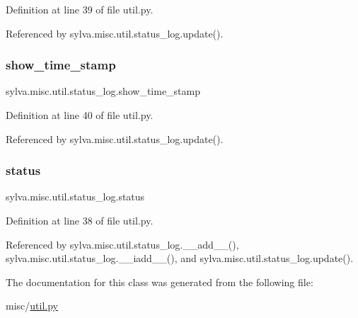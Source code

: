 Definition at line 39 of file util.\+py.



Referenced by sylva.\+misc.\+util.\+status\+\_\+log.\+update().

\mbox{\label{classsylva_1_1misc_1_1util_1_1status__log_a799f3dda1ada1a55c9febe98843c5ec6}} 
\subsubsection{\texorpdfstring{show\+\_\+time\+\_\+stamp}{show\_time\_stamp}}
{\footnotesize\ttfamily sylva.\+misc.\+util.\+status\+\_\+log.\+show\+\_\+time\+\_\+stamp}



Definition at line 40 of file util.\+py.



Referenced by sylva.\+misc.\+util.\+status\+\_\+log.\+update().

\mbox{\label{classsylva_1_1misc_1_1util_1_1status__log_a8e25853177439515a92f83c533247b46}} 
\subsubsection{\texorpdfstring{status}{status}}
{\footnotesize\ttfamily sylva.\+misc.\+util.\+status\+\_\+log.\+status}



Definition at line 38 of file util.\+py.



Referenced by sylva.\+misc.\+util.\+status\+\_\+log.\+\_\+\+\_\+add\+\_\+\+\_\+(), sylva.\+misc.\+util.\+status\+\_\+log.\+\_\+\+\_\+iadd\+\_\+\+\_\+(), and sylva.\+misc.\+util.\+status\+\_\+log.\+update().



The documentation for this class was generated from the following file\+:\begin{DoxyCompactItemize}
\item 
misc/\hyperlink{util_8py}{util.\+py}\end{DoxyCompactItemize}
